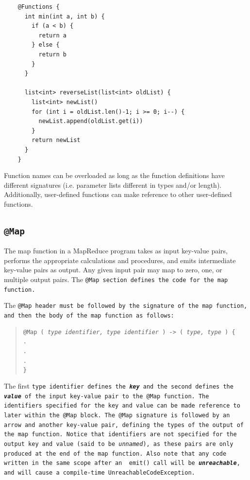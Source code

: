\documentclass{article}
\begin{document}
\begin{verbatim}
    @Functions {
      int min(int a, int b) {
        if (a < b) {
          return a
        } else {
          return b
        }
      }

      list<int> reverseList(list<int> oldList) {
        list<int> newList()
        for (int i = oldList.len()-1; i >= 0; i--) {
          newList.append(oldList.get(i))
        }
        return newList
      }
    }
\end{verbatim}

Function names can be overloaded as long as the function definitions have different
signatures (i.e. parameter lists different in types and/or length). Additionally,
user-defined functions can make reference to other user-defined functions.


\subsection{\tt @Map \rm} %
\label{sub:tt_map_rm}

The map function in a MapReduce program takes as input key-value pairs, performs
the appropriate calculations and procedures, and emits intermediate key-value
pairs as output. Any given input pair may map to zero, one, or multiple output
pairs. The \tt @Map \rm section defines the code for the map function.

The \tt @Map \rm header must be followed by the signature of the map function, and
then the body of the map function as follows:

\begin{quotation}
  \tt @Map ( \rm \emph{type identifier, type identifier} \tt ) -> ( \rm \emph{type, type} \tt ) \{ \\
  \indent \indent . \\
  \indent \indent . \\
  \indent \indent . \\
  \indent \tt \} \rm
\end{quotation}

The first \tt type identifier \rm defines the \emph{\textbf{key}} and the second
defines the \emph{\textbf{value}} of the input key-value pair to the \tt @Map \rm
function. The identifiers specified for the key and value can be made reference to
later within the \tt @Map \rm block. The \tt @Map \rm signature is followed by an
arrow and another key-value pair, defining the types of the output of the map
function. Notice that identifiers are not specified for the output key and value
(said to be \emph{unnamed}), as these pairs are only produced at the end of the
map function. Also note that any code written in the same scope after an \tt
emit() \rm call will be \textbf{\emph{unreachable}}, and will cause a compile-time
\tt UnreachableCodeException\rm.
\end{document}
